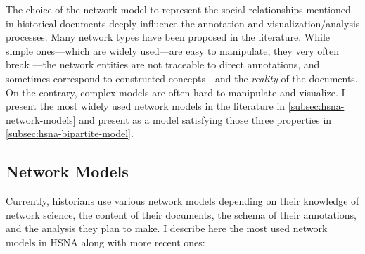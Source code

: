 The choice of the network model to represent the social relationships mentioned in historical documents deeply influence the annotation and visualization/analysis processes.
Many network types have been proposed in the literature.
While simple ones---which are widely used---are easy to manipulate, they very often break \traceability---the network entities are not traceable to direct annotations, and sometimes correspond to constructed concepts---and the \emph{reality} of the documents.
On the contrary, complex models are often hard to manipulate and visualize.
I present the most widely used network models in the \hsna literature in \autoref{subsec:hsna-network-models} and present \modelplural as a model satisfying those three properties in \autoref{subsec:hsna-bipartite-model}.

\subsection{Network Models}\label{subsec:hsna-network-models}

Currently, historians use various network models depending on their knowledge of network science, the content of their documents, the schema of their annotations, and the analysis they plan to make.
I describe here the most used network models in HSNA along with more recent ones:

